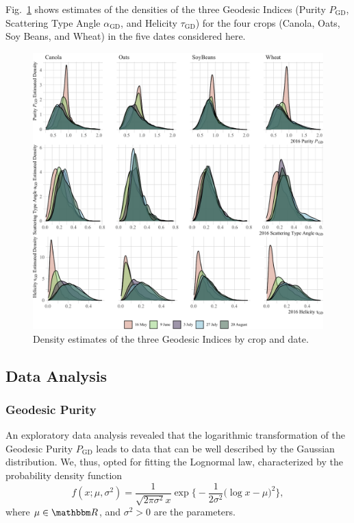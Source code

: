 \documentclass[journal]{IEEEtran}
\begin{document}
	Fig.~\ref{fig:AllIndexes} shows estimates of the densities of the three Geodesic Indices (Purity $P_{\text{GD}}$, Scattering Type Angle $\alpha_{\text{GD}}$, and Helicity $\tau_{\text{GD}}$) for the four crops (Canola, Oats, Soy Beans, and Wheat) in the five dates considered here.
	
	\begin{figure}[htb]
		\centering
		\includegraphics[width=\linewidth]{Indexes}
		\caption{Density estimates of the three Geodesic Indices by crop and date.}\label{fig:AllIndexes}
	\end{figure}
	
	\subsection{Data Analysis}
	
	\subsubsection{Geodesic Purity}
	
	An exploratory data analysis revealed that the logarithmic transformation of the Geodesic Purity $P_{\text{GD}}$ leads to data that can be well described by the Gaussian distribution.
	We, thus, opted for fitting the Lognormal law, characterized by the probability density function
	\begin{equation}
		f(x;\mu,\sigma^2) = \frac{1}{\sqrt{2\pi\sigma^2} x} \exp\Big\{
		-\frac1{2 \sigma^2}\big(\log x - \mu\big)^2
		\Big\},
	\end{equation}
	where $\mu\in\mathbbm R$, and $\sigma^2>0$ are the parameters.
	
\end{document}
